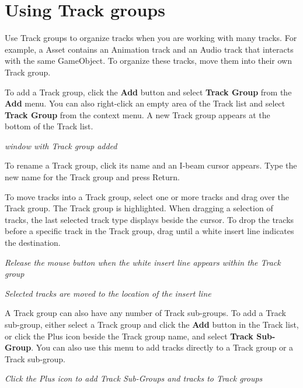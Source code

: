 \chapter{Using Track groups}
\hypertarget{md__hey_tea_9_2_library_2_package_cache_2com_8unity_8timeline_0d1_87_85_2_documentation_0i_2grp__use}{}\label{md__hey_tea_9_2_library_2_package_cache_2com_8unity_8timeline_0d1_87_85_2_documentation_0i_2grp__use}
\label{md__hey_tea_9_2_library_2_package_cache_2com_8unity_8timeline_0d1_87_85_2_documentation_0i_2grp__use_autotoc_md4644}%
%
 Use Track groups to organize tracks when you are working with many tracks. For example, a  Asset contains an Animation track and an Audio track that interacts with the same Game\+Object. To organize these tracks, move them into their own Track group.

To add a Track group, click the {\bfseries{Add}} button and select {\bfseries{Track Group}} from the {\bfseries{Add}} menu. You can also right-\/click an empty area of the Track list and select {\bfseries{Track Group}} from the context menu. A new Track group appears at the bottom of the Track list.



{\itshape {} window with Track group added}

To rename a Track group, click its name and an I-\/beam cursor appears. Type the new name for the Track group and press Return.

To move tracks into a Track group, select one or more tracks and drag over the Track group. The Track group is highlighted. When dragging a selection of tracks, the last selected track type displays beside the cursor. To drop the tracks before a specific track in the Track group, drag until a white insert line indicates the destination.



{\itshape Release the mouse button when the white insert line appears within the Track group}



{\itshape Selected tracks are moved to the location of the insert line}

A Track group can also have any number of Track sub-\/groups. To add a Track sub-\/group, either select a Track group and click the {\bfseries{Add}} button in the Track list, or click the Plus icon beside the Track group name, and select {\bfseries{Track Sub-\/\+Group}}. You can also use this menu to add tracks directly to a Track group or a Track sub-\/group.



{\itshape Click the Plus icon to add Track Sub-\/\+Groups and tracks to Track groups} 